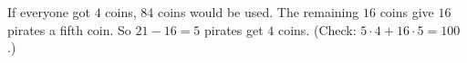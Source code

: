 If everyone got $4$ coins, $84$ coins would be used. The remaining $16$ coins give $16$ pirates a fifth coin. So $21-16=\boxed{5}$ pirates get $4$ coins. (Check: $5\cdot4+16\cdot5=100$.)

